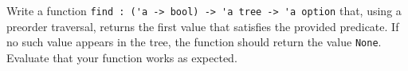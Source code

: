Write a function \lstinline{find : ('a -> bool) -> 'a tree -> 'a option} that, using a preorder traversal, returns the first value that satisfies the provided predicate. If no such value appears in the tree, the function should return the value \lstinline{None}. Evaluate
that your function works as expected.
